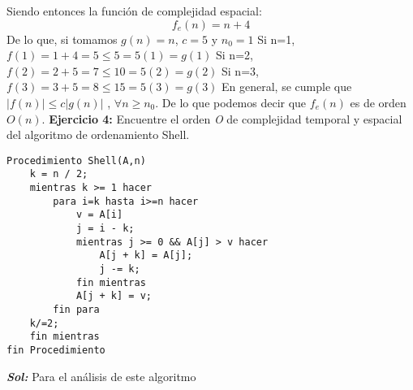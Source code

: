 \documentclass[12pt, letterpaper, twoside]{article}
\begin{document}
Siendo entonces la función de complejidad espacial:
\[f_{e}(n)=n+4\]
De lo que, si tomamos $g(n)=n$, $c=5$ y $n_{0}=1$
\newline
Si n=1,
\center$f(1)=1+4=5\leq 5=5(1)=g(1)$
\justify
Si n=2,
\center$f(2)=2+5=7\leq 10=5(2)=g(2)$
\justify
Si n=3,
\center$f(3)=3+5=8\leq 15=5(3)=g(3)$
\justify
En general, se cumple que
\center$|f(n)|\leq c|g(n)|$ , $\forall n\geq n_{0}$.
\justify
De lo que podemos decir que $f_{e}(n)$ es de orden $O(n)$.
\newpage
\textbf{Ejercicio 4:} Encuentre el orden \textit{O} de complejidad temporal y espacial del algoritmo de ordenamiento Shell.
\begin{lstlisting}
Procedimiento Shell(A,n)
	k = n / 2;
	mientras k >= 1 hacer
		para i=k hasta i>=n hacer
			v = A[i]
			j = i - k;
			mientras j >= 0 && A[j] > v hacer
				A[j + k] = A[j];
				j -= k;
			fin mientras
			A[j + k] = v;
		fin para
	k/=2;
	fin mientras
fin Procedimiento
\end{lstlisting}
\justify
\textbf{\textit{Sol:}}
Para el análisis de este algoritmo
\end{document}
